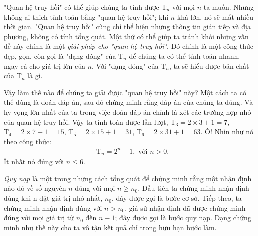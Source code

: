 "Quan hệ truy hồi" có thể giúp chúng ta tính được $\mathrm{T}_n$ với mọi $n$ ta muốn. Nhưng không ai thich tính toán bằng "quan hệ truy hồi"; khi $n$ khá lớn, nó sẽ mất nhiều thời gian. "Quan hệ truy hồi" cũng chỉ thể hiện những thông tin gián tiếp và địa phương, không có tính tổng quát. Một thứ có thể giúp ta tránh khỏi những vấn đề này chính là một \textit{giải pháp cho "quan hệ truy hồi"}. Đó chính là một công thức đẹp, gọn, còn gọi là "dạng đóng" của $\mathrm{T}_n$ để chúng ta có thể tính toán nhanh, ngay cả cho giá trị lớn của $n$. Với "dạng đóng" của $\mathrm{T}_n$, ta sẽ hiểu được bản chất của $\mathrm{T}_n$ là gì.

Vậy làm thế nào để chúng ta giải được "quan hệ truy hồi" này? Một cách ta có thể dùng là đoán đáp án, sau đó chứng minh rằng đáp án của chúng ta đúng. Và hy vọng lớn nhất của ta trong việc đoán đáp án chính là xét các trường hợp nhỏ của quan hệ truy hồi. Vậy ta tính toán được lần lượt, $\mathrm{T}_3 = 2 \times 3 + 1 = 7$, $\mathrm{T}_4 = 2 \times 7 + 1 = 15$, $\mathrm{T}_5 = 2 \times 15 + 1 = 31$, $\mathrm{T}_6 = 2 \times 31 + 1 = 63$. Ô! Nhìn như nó theo công thức:
\begin{equation}\label{eq:1.2}
    \begin{aligned}
        & \mathrm{T}_n = 2^n - 1, \text{ \ \ \ \ với } n > 0.
    \end{aligned}
\end{equation}
Ít nhất nó đúng với $n \le 6$.


\textit{Quy nạp} 
là một trong những cách tổng quát để chứng minh rằng một nhận định nào đó về số nguyên $n$ đúng với mọi $n \ge n_0$. Đầu tiên ta chứng minh nhận định đúng khi n đặt giá trị nhỏ nhất, $n_0$, đây được gọi là bước cơ sở. Tiếp theo, ta chứng minh nhận định đúng với $n > n_0$, giả sử nhận định đã được chứng minh đúng với mọi giá trị từ $n_0$ đến $n - 1$; đây được gọi là bước quy nạp. Dạng chứng minh như thế này cho ta vô tận kết quả chỉ trong hữu hạn bước làm.



